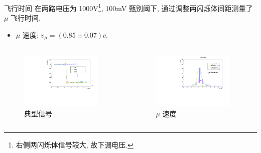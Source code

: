 \documentclass[10pt]{beamer}
\begin{document}
\begin{frame}[label={sec:org6a6c780}]{飞行时间}
在两路电压为 1000V\footnote{右侧两闪烁体信号较大, 故下调电压.}, 100mV 甄别阈下, 通过调整两闪烁体间距测量了 \(\mu\) 飞行时间.

\begin{itemize}
\item \(\mu\) 速度: \(v_{\mu} = (0.85 \pm 0.07) c\).
\end{itemize}

\begin{columns}
\begin{column}{0.5\columnwidth}
\begin{figure}[htbp]
\centering
\includegraphics[width=0.9\textwidth]{../../ExperimentData/muspeed/muspeed/muspeed0.pdf}
\caption{典型信号}
\end{figure}
\end{column}

\begin{column}{0.5\columnwidth}
\begin{figure}[htbp]
\centering
\includegraphics[width=0.9\textwidth]{../../mu/muspeed/muspeed.pdf}
\caption{\(\mu\) 速度}
\end{figure}
\end{column}
\end{columns}
\end{frame}
\end{document}
